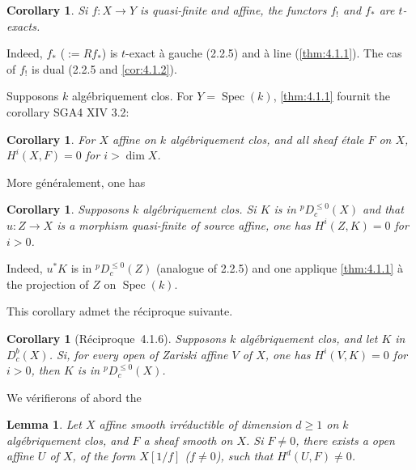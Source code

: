 \documentclass[12pt,a4paper]{article}
\theoremstyle{plain}
\newtheorem{lemma}[theorem]{Lemma}
\newtheorem{corollary}[theorem]{Corollary}
\theoremstyle{definition}
\DeclareMathOperator{\Spec}{Spec}
\providecommand{\Spec}{\operatorname{Spec}}
\begin{document}
\begin{corollary}\label{cor:4.1.3}
Si $f: X \to Y$ is quasi-finite and affine, the functors $f_{!}$ and $f_{*}$ are $t$-exacts.
\end{corollary}

Indeed, $f_{*}$ ($:= Rf_{*}$) is $t$-exact \`{a} gauche (2.2.5) and \`{a} line (\ref{thm:4.1.1}). The cas of $f_{!}$ is dual (2.2.5 and \ref{cor:4.1.2}).

Supposons $k$ alg\'{e}briquement clos. For $Y = \Spec(k)$, \ref{thm:4.1.1} fournit the corollary SGA4 XIV 3.2:

\begin{corollary}\label{cor:4.1.4}
For $X$ affine on $k$ alg\'{e}briquement clos, and all sheaf \'{e}tale $F$ on $X$, $H^{i}(X,F) = 0$ for $i > \dim X$.
\end{corollary}

More g\'{e}n\'{e}ralement, one has

\begin{corollary}\label{cor:4.1.5}
Supposons $k$ alg\'{e}briquement clos. Si $K$ is in ${}^{p}D_{c}^{\leq 0}(X)$ and that $u: Z \to X$ is a morphism quasi-finite of source affine, one has $H^{i}(Z,K) = 0$ for $i > 0$.
\end{corollary}

Indeed, $u^{*}K$ is in ${}^{p}D_{c}^{\leq 0}(Z)$ (analogue of 2.2.5) and one applique \ref{thm:4.1.1} \`{a} the projection of $Z$ on $\Spec(k)$.

This corollary admet the r\'{e}ciproque suivante.

\begin{corollary}[R\'{e}ciproque~4.1.6]\label{cor:4.1.6}
Supposons $k$ alg\'{e}briquement clos, and let $K$ in $D_{c}^{b}(X)$. Si, for every open of Zariski affine $V$ of $X$, one has $H^{i}(V,K) = 0$ for $i > 0$, then $K$ is in ${}^{p}D_{c}^{\leq 0}(X)$.
\end{corollary}

We v\'{e}rifierons of abord the

\begin{lemma}\label{lem:4.1.7}
Let $X$ affine smooth irr\'{e}ductible of dimension $d \geq 1$ on $k$ alg\'{e}briquement clos, and $F$ a sheaf smooth on $X$. Si $F \neq 0$, there exists a open affine $U$ of $X$, of the form $X[1/f]$ ($f \neq 0$), such that $H^{d}(U,F) \neq 0$.
\end{lemma}
\end{document}
